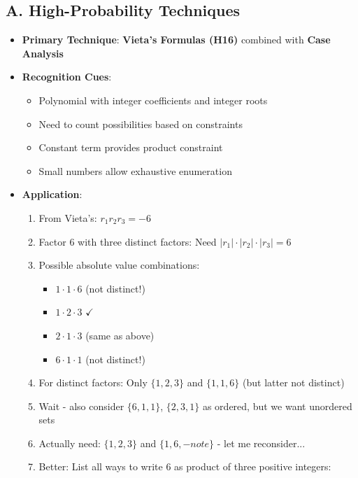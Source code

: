 \documentclass[12pt]{article}
\begin{document}
\begin{techniquesbox}
\subsection*{A. High-Probability Techniques}
\begin{itemize}[leftmargin=*]
    \item \textbf{Primary Technique}: \textbf{Vieta's Formulas (H16)} combined with \textbf{Case Analysis}
    \item \textbf{Recognition Cues}: 
    \begin{itemize}
        \item Polynomial with integer coefficients and integer roots
        \item Need to count possibilities based on constraints
        \item Constant term provides product constraint
        \item Small numbers allow exhaustive enumeration
    \end{itemize}
    \item \textbf{Application}: 
    \begin{enumerate}
        \item From Vieta's: $r_1 r_2 r_3 = -6$
        \item Factor 6 with three distinct factors: Need $|r_1| \cdot |r_2| \cdot |r_3| = 6$
        \item Possible absolute value combinations:
        \begin{itemize}
            \item $1 \cdot 1 \cdot 6$ (not distinct!)
            \item $1 \cdot 2 \cdot 3$ $\checkmark$
            \item $2 \cdot 1 \cdot 3$ (same as above)
            \item $6 \cdot 1 \cdot 1$ (not distinct!)
        \end{itemize}
        \item For distinct factors: Only $\{1, 2, 3\}$ and $\{1, 1, 6\}$ (but latter not distinct)
        \item Wait - also consider $\{6, 1, 1\}$, $\{2, 3, 1\}$ as ordered, but we want unordered sets
        \item Actually need: $\{1, 2, 3\}$ and $\{1, 6, -note\}$ - let me reconsider...
        \item Better: List all ways to write $6$ as product of three positive integers:
        \begin{itemize}

\end{itemize}
\end{enumerate}
\end{itemize}
\end{techniquesbox}
\end{document}

